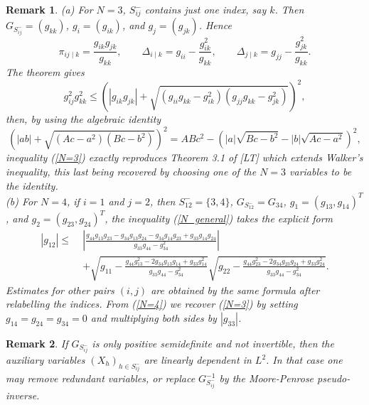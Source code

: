 \documentclass[10pt,a4paper]{amsart}
\newtheorem{remark}{Remark}
\begin{document}
\begin{remark}
(a) For $N=3$, $S^{-}_{ij}$ contains just one index, say $k$. Then $G_{S^{-}_{ij}}=({g}_{kk})$, $g_i=({g}_{ik})$, and $g_j=({g}_{jk})$. Hence
\begin{equation}
\pi_{ij\mid k}=\frac{{g}_{ik}{g}_{jk}}{{g}_{kk}},
\qquad
\Delta_{i\mid k}={g}_{ii}-\frac{{g}_{ik}^2}{{g}_{kk}},
\qquad
\Delta_{j\mid k}={g}_{jj}-\frac{{g}_{jk}^2}{{g}_{kk}}.
\end{equation}
The theorem gives
\begin{equation}\label{N=3}
{g}_{ij}^2g_{kk}^2
\leq
\left(
\left|{g}_{ik}{g}_{jk}
\right|
+
\sqrt{
\left({g}_{ii}g_{kk}-{g}_{ik}^2\right)
\left({g}_{jj}g_{kk}-{g}_{jk}^2\right)
}
\right)^2,
\end{equation}
then, by using the algebraic identity 
$$
\left(
|ab|+
\sqrt{(Ac-a^2)(Bc-b^2)}
\right)^2
=
ABc^2
-
\left(
|a|\sqrt{Bc-b^2}
-
|b|\sqrt{Ac-a^2}
\right)^2,
$$
inequality (\ref{N=3}) exactly reproduces Theorem 3.1 of [LT] which extends Walker's inequality, this last being recovered by choosing one of the $N=3$ variables to be the identity.\\
(b) For $N=4$, if $i=1$ and $j=2$, then $S^{-}_{12}=\{3,4\}$, $G_{S^{-}_{12}}=G_{34}$, $g_1=({g}_{13},{g}_{14})^T$, and $g_2=({g}_{23},{g}_{24})^T$, the inequality (\ref{N_general}) takes the explicit form 
\begin{equation}\label{N=4}
\begin{aligned}
\left| g_{12} \right|
\leq\;&
\left|
\frac{
g_{44}g_{13}g_{23}
-
g_{34}g_{13}g_{24}
-
g_{34}g_{14}g_{23}
+
g_{33}g_{14}g_{24}
}{
g_{33}g_{44}-g_{34}^2
}
\right|
\\[0.5em]
&+
\sqrt{
g_{11}
-
\frac{
g_{44}g_{13}^2
-
2g_{34}g_{13}g_{14}
+
g_{33}g_{14}^2
}{
g_{33}g_{44}-g_{34}^2
}
}
\sqrt{
g_{22}
-
\frac{
g_{44}g_{23}^2
-
2g_{34}g_{23}g_{24}
+
g_{33}g_{24}^2
}{
g_{33}g_{44}-g_{34}^2
}
}.
\end{aligned}
\end{equation}
Estimates for other pairs $(i,j)$ are obtained by the same formula after relabelling the indices. From (\ref{N=4}) we recover (\ref{N=3}) by setting $g_{14}=g_{24}=g_{34}=0$ and multiplying both sides by $|g_{33}|$.
\end{remark}

\begin{remark}
If $G_{S^{-}_{ij}}$ is only positive semidefinite and not invertible, then the auxiliary variables $(X_h)_{h\in S^{-}_{ij}}$ are linearly dependent in $L^2$. In that case one may remove redundant variables, or replace $G_{S^{-}_{ij}}^{-1}$ by the Moore-Penrose pseudo-inverse.
\end{remark}
\end{document}
